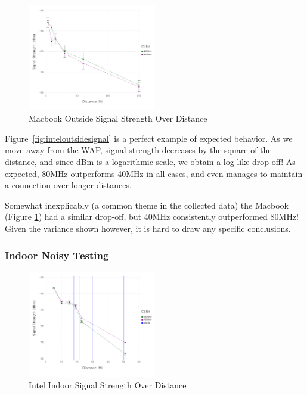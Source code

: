 \begin{figure}[!h]
\centering
\includegraphics[width=0.5\textwidth]{figures/Mac_Outside_Beamformed}
\caption{Macbook Outside Signal Strength Over Distance}
\label{fig:macoutsidesignal}
\end{figure}


Figure~\ref{fig:inteloutsidesignal} is a perfect example of expected
behavior. As we move away from the WAP, signal strength decreases by
the square of the distance, and since dBm is a logarithmic scale, we
obtain a log-like drop-off! As expected, 80MHz outperforms 40MHz in
all cases, and even manages to maintain a connection over longer
distances.

Somewhat inexplicably (a common theme in the collected data) the
Macbook (Figure \ref{fig:macoutsidesignal}) had a similar drop-off, but
40MHz consistently outperformed 80MHz! Given the variance shown
however, it is hard to draw any specific conclusions. 

\subsubsection{Indoor Noisy Testing}


\begin{figure}[!h]
\centering
\includegraphics[width=0.5\textwidth]{figures/Intel_Inside_Beamformed}
\caption{Intel Indoor Signal Strength Over Distance}
\label{fig:intelinsidesignal}
\end{figure}

